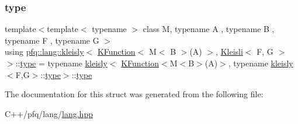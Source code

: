 \subsubsection{\texorpdfstring{type}{type}}
{\footnotesize\ttfamily template$<$template$<$ typename $>$ class M, typename A , typename B , typename F , typename G $>$ \\
using \hyperlink{structpfq_1_1lang_1_1kleisly}{pfq\+::lang\+::kleisly}$<$ \hyperlink{structpfq_1_1lang_1_1KFunction}{K\+Function}$<$ M$<$ B $>$(A) $>$, \hyperlink{structpfq_1_1lang_1_1Kleisli}{Kleisli}$<$ F, G $>$ $>$\+::\hyperlink{structpfq_1_1lang_1_1kleisly_3_01KFunction_3_01M_3_01B_01_4_07A_08_01_4_00_01Kleisli_3_01F_00_01G_01_4_01_4_a0d400d4878fb63c2dd734b642e395020}{type} =  typename \hyperlink{structpfq_1_1lang_1_1kleisly}{kleisly}$<$ \hyperlink{structpfq_1_1lang_1_1KFunction}{K\+Function}$<$M$<$B$>$(A)$>$, typename \hyperlink{structpfq_1_1lang_1_1kleisly}{kleisly}$<$F,G$>$\+::\hyperlink{structpfq_1_1lang_1_1kleisly_3_01KFunction_3_01M_3_01B_01_4_07A_08_01_4_00_01Kleisli_3_01F_00_01G_01_4_01_4_a0d400d4878fb63c2dd734b642e395020}{type}$>$\+::\hyperlink{structpfq_1_1lang_1_1kleisly_3_01KFunction_3_01M_3_01B_01_4_07A_08_01_4_00_01Kleisli_3_01F_00_01G_01_4_01_4_a0d400d4878fb63c2dd734b642e395020}{type}}



The documentation for this struct was generated from the following file\+:\begin{DoxyCompactItemize}
\item 
C++/pfq/lang/\hyperlink{lang_8hpp}{lang.\+hpp}\end{DoxyCompactItemize}
